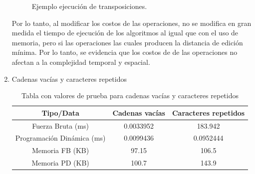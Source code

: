 \begin{enumerate}
\begin{figure}[H]
        \hfill
        \caption{Ejemplo ejecución de transposiciones.}
        \label{fig:trans}
    \end{figure}

    Por lo tanto, al modificar los costos de las operaciones, no
    se modifica en gran medida el tiempo de ejecución de los algoritmos
    al igual que con el uso de memoria, pero si las operaciones las cuales producen la distancia de edición
    mínima. Por lo tanto,
    se evidencia que los costos de de las operaciones no afectan a la complejidad
    temporal y espacial.

    \item Cadenas vacías y caracteres repetidos
    
        \begin{table}[H]
        \centering
        \begin{tabular}{|c|c|c|}
        \hline
        \textbf{Tipo/Data} & \textbf{Cadenas vacías} & \textbf{Caracteres repetidos}\\ \hline
        Fuerza Bruta (ms) & 0.0033952 & 183.942 \\ \hline
        Programación Dinámica (ms) & 0.0099436 & 0.0952444 \\ \hline
        Memoria FB (KB) & 97.15 & 106.5   \\ \hline
        Memoria PD (KB) & 100.7 & 143.9 \\ \hline
      
        \end{tabular}
        \caption{Tabla con valores de prueba para cadenas vacías y caracteres repetidos}
        \label{tab:tabla2}
        \end{table}


\end{enumerate}
